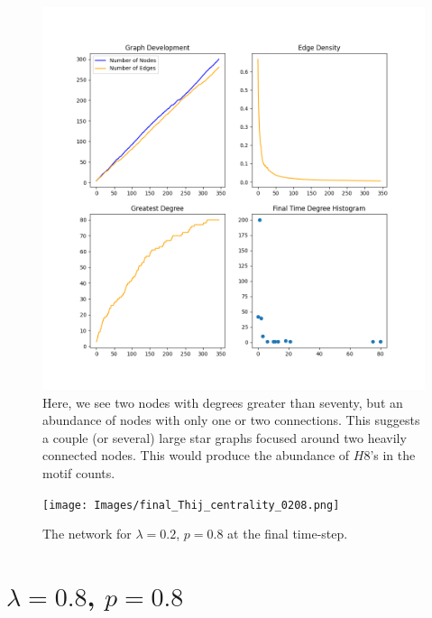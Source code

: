 \begin{figure}[h!]
    \includegraphics[width=14cm]{Images/twitter_sim_stats_3_0.2_0.8.png}
    \centering
    \caption{Here, we see two nodes with degrees greater than seventy,
    but an abundance of nodes with only one or two connections. This suggests
     a couple (or several) large star graphs focused around two heavily connected nodes. This 
    would produce the abundance of $H8$'s in the motif counts.}
    \label{fig:twittersim28}
\end{figure}


\begin{figure}[h!]
    \texttt{[image: Images/final\_Thij\_centrality\_0208.png]}
    \centering
    \caption{The network for $\lambda=0.2$, $p=0.8$ at the final time-step.}
    \label{fig:network0208}
\end{figure}

\clearpage

\section{$\lambda=0.8$, $p=0.8$}


